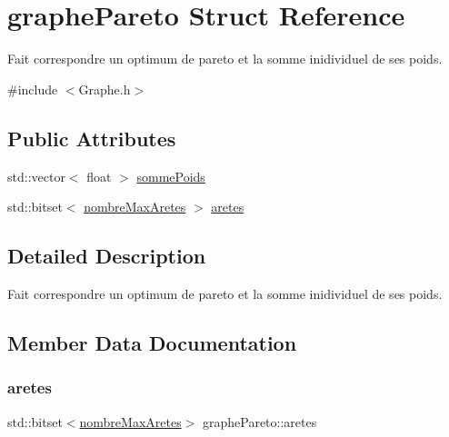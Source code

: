 \hypertarget{structgraphe_pareto}{}\section{graphe\+Pareto Struct Reference}
\label{structgraphe_pareto}


Fait correspondre un optimum de pareto et la somme inidividuel de ses poids.  




{\ttfamily \#include $<$Graphe.\+h$>$}

\subsection*{Public Attributes}
\begin{DoxyCompactItemize}
\item 
std\+::vector$<$ float $>$ \mbox{\hyperlink{structgraphe_pareto_ada46b8bdd6987c7dafd036beef779e15}{somme\+Poids}}
\item 
std\+::bitset$<$ \mbox{\hyperlink{libraries_8h_a5d5c6b0caa76f25c1987a5b7b1c335b8}{nombre\+Max\+Aretes}} $>$ \mbox{\hyperlink{structgraphe_pareto_aa2d8042cf42e1253976e3d71d8b6a1d6}{aretes}}
\end{DoxyCompactItemize}


\subsection{Detailed Description}
Fait correspondre un optimum de pareto et la somme inidividuel de ses poids. 

\subsection{Member Data Documentation}
\mbox{\label{structgraphe_pareto_aa2d8042cf42e1253976e3d71d8b6a1d6}} 
\subsubsection{\texorpdfstring{aretes}{aretes}}
{\footnotesize\ttfamily std\+::bitset$<$\mbox{\hyperlink{libraries_8h_a5d5c6b0caa76f25c1987a5b7b1c335b8}{nombre\+Max\+Aretes}}$>$ graphe\+Pareto\+::aretes}

\mbox{\label{structgraphe_pareto_ada46b8bdd6987c7dafd036beef779e15}} 
